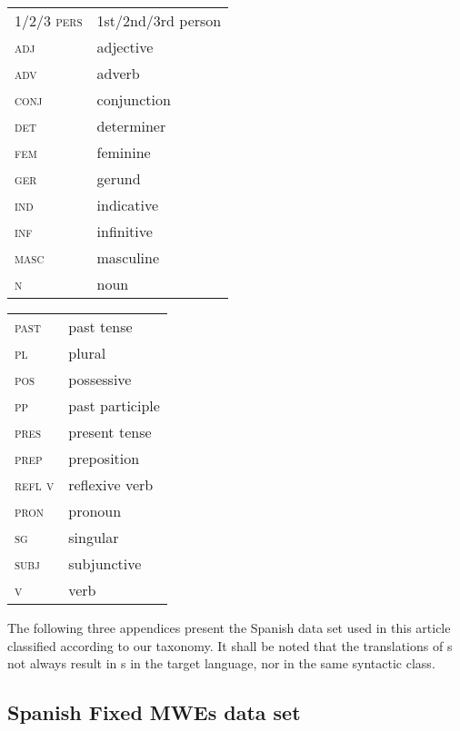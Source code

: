 \documentclass[output=paper]{langsci/langscibook}
\begin{document}
 
\begin{tabularx}{.45\textwidth}{>{\scshape}lQ}
1/2/3 pers & 1st/2nd/3rd person \\
adj & adjective \\
adv & adverb \\
conj & conjunction \\
det & determiner \\
fem & feminine \\
ger & gerund \\
ind & indicative \\
inf & infinitive \\
masc & masculine \\
n & noun \\
\end{tabularx}
\begin{tabularx}{.45\textwidth}{>{\scshape}lQ}
past & past tense \\
pl & plural \\
pos & possessive \\
pp & past participle \\
pres & present tense \\
prep & preposition \\
refl v & reflexive verb \\
pron & pronoun \\
sg & singular \\
subj & subjunctive\\
v & verb \\
\end{tabularx} 
\medskip


 
\largerpage[2]
The following three appendices 
present the Spanish data set used in this article classified according to our taxonomy.
It shall be noted that the translations of \mwe s not always result in \mwe s in the target language, nor in the same syntactic class.

\subsection{Spanish Fixed MWEs data set}
\label{sec:appendixA_fixedMWEs}
\end{document}
